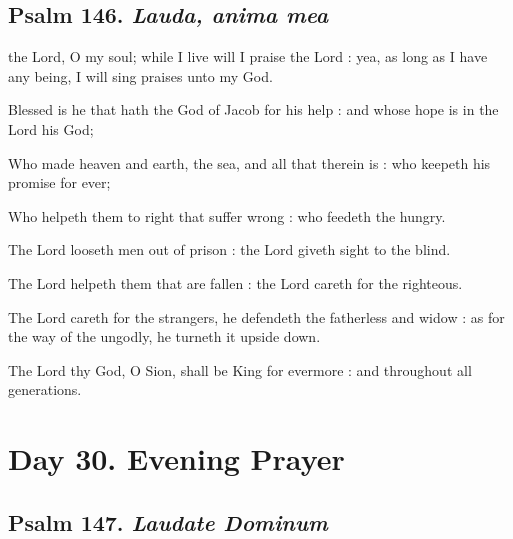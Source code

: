 \clearpage
\subsection{Psalm 146. \textit{Lauda, anima mea}}

 the Lord, O my soul; while I live will I praise the Lord : yea, as long as I have any being, I will sing praises unto my God.\par
{}
Blessed is he that hath the God of Jacob for his help : and whose hope is in the Lord his God;\par
{}Who made heaven and earth, the sea, and all that therein is : who keepeth his promise for ever;\par
{}Who helpeth them to right that suffer wrong : who feedeth the hungry.\par
{}The Lord looseth men out of prison : the Lord giveth sight to the blind.\par
{}The Lord helpeth them that are fallen : the Lord careth for the righteous.\par
{}The Lord careth for the strangers, he defendeth the fatherless and widow : as for the way of the ungodly, he turneth it upside down.\par
{}The Lord thy God, O Sion, shall be King for evermore : and throughout all generations.\par

\section*{Day 30. Evening Prayer}

\subsection{Psalm 147. \textit{Laudate Dominum}}


